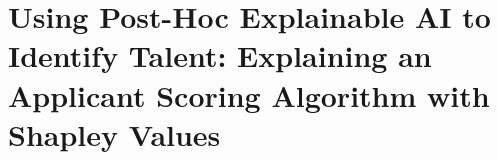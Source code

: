 

\chapter{\label{ch:xai}Using Post-Hoc Explainable AI to Identify Talent: Explaining an Applicant Scoring Algorithm with Shapley Values}

